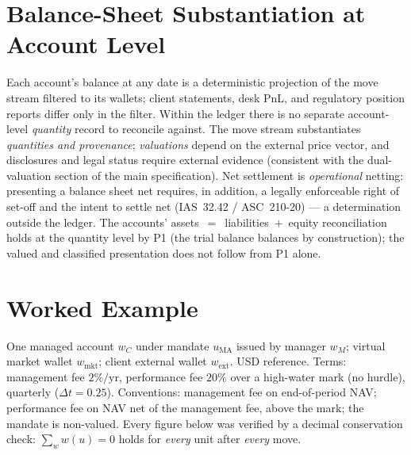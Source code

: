 \documentclass[11pt,a4paper]{article}
\begin{document}
\section{Balance-Sheet Substantiation at Account Level}
\label{sec:substantiation}

Each account's balance at any date is a deterministic projection of the move stream filtered to
its wallets; client statements, desk PnL, and regulatory position reports differ only in the
filter. Within the ledger there is no separate account-level \emph{quantity} record to reconcile
against. The move stream substantiates \emph{quantities and
provenance}; \emph{valuations} depend on the external price vector, and disclosures and legal
status require external evidence (consistent with the dual-valuation section of the main
specification). Net settlement is \emph{operational} netting: presenting a balance sheet net
requires, in addition, a legally enforceable right of set-off and the intent to settle net
(IAS~32.42 / ASC~210-20) --- a determination outside the ledger. The accounts'
assets~$=$~liabilities~$+$~equity reconciliation holds at the quantity level by P1 (the trial
balance balances by construction); the valued and classified presentation does not follow from P1
alone.

\section{Worked Example}
\label{sec:example}

One managed account $w_C$ under mandate $u_{\mathrm{MA}}$ issued by manager $w_M$; virtual market
wallet $w_{\text{mkt}}$; client external wallet $w_{\text{ext}}$. USD reference. Terms: management
fee $2\%/\text{yr}$, performance fee $20\%$ over a high-water mark (no hurdle), quarterly
($\Delta t=0.25$). Conventions: management fee on end-of-period NAV; performance fee on NAV net of
the management fee, above the mark; the mandate is non-valued. Every figure below was verified by
a decimal conservation check: $\sum_w w(u)=0$ holds for \emph{every} unit after \emph{every} move.
\end{document}
